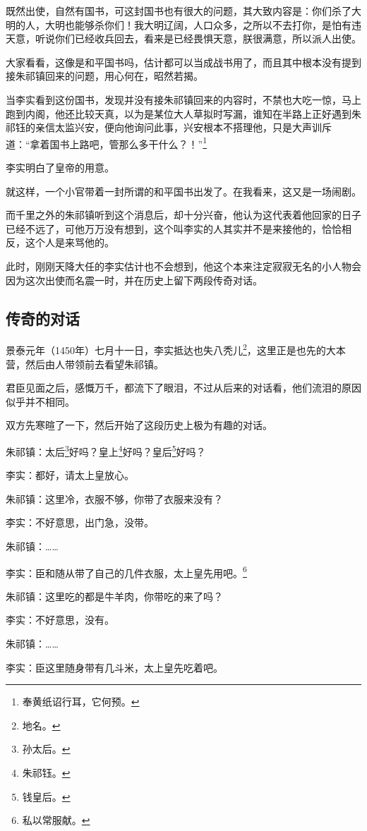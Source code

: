 \begin{multicols}{\theparacolNo}
既然出使，自然有国书，可这封国书也有很大的问题，其大致内容是：你们杀了大明的人，大明也能够杀你们！我大明辽阔，人口众多，之所以不去打你，是怕有违天意，听说你们已经收兵回去，看来是已经畏惧天意，朕很满意，所以派人出使。

大家看看，这像是和平国书吗，估计都可以当成战书用了，而且其中根本没有提到接朱祁镇回来的问题，用心何在，昭然若揭。

当李实看到这份国书，发现并没有接朱祁镇回来的内容时，不禁也大吃一惊，马上跑到内阁，他还比较天真，以为是某位大人草拟时写漏，谁知在半路上正好遇到朱祁钰的亲信太监兴安，便向他询问此事，兴安根本不搭理他，只是大声训斥道：“拿着国书上路吧，管那么多干什么？！”\footnote{奉黄纸诏行耳，它何预。}

李实明白了皇帝的用意。

就这样，一个小官带着一封所谓的和平国书出发了。在我看来，这又是一场闹剧。

而千里之外的朱祁镇听到这个消息后，却十分兴奋，他认为这代表着他回家的日子已经不远了，可他万万没有想到，这个叫李实的人其实并不是来接他的，恰恰相反，这个人是来骂他的。

此时，刚刚天降大任的李实估计也不会想到，他这个本来注定寂寂无名的小人物会因为这次出使而名震一时，并在历史上留下两段传奇对话。

\subsection{传奇的对话}
景泰元年（1450年）七月十一日，李实抵达也失八秃儿\footnote{地名。}，这里正是也先的大本营，然后由人带领前去看望朱祁镇。

君臣见面之后，感慨万千，都流下了眼泪，不过从后来的对话看，他们流泪的原因似乎并不相同。

双方先寒暄了一下，然后开始了这段历史上极为有趣的对话。

朱祁镇：太后\footnote{孙太后。}好吗？皇上\footnote{朱祁钰。}好吗？皇后\footnote{钱皇后。}好吗？

李实：都好，请太上皇放心。

朱祁镇：这里冷，衣服不够，你带了衣服来没有？

李实：不好意思，出门急，没带。

朱祁镇：……

李实：臣和随从带了自己的几件衣服，太上皇先用吧。\footnote{私以常服献。}

朱祁镇：这里吃的都是牛羊肉，你带吃的来了吗？

李实：不好意思，没有。

朱祁镇：……

李实：臣这里随身带有几斗米，太上皇先吃着吧。


\end{multicols}
